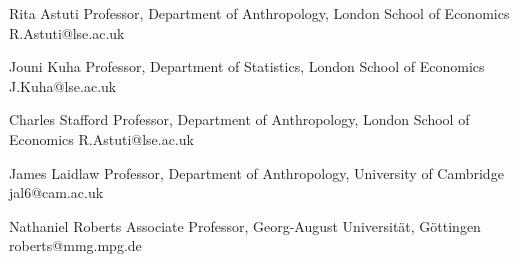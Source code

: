 

\begin{cvreferences}


  \cvreference
    {Rita Astuti} %
    {Professor, Department of Anthropology, London School of Economics} %
    {R.Astuti@lse.ac.uk}

  \cvreference
    {Jouni Kuha} %
    {Professor, Department of Statistics, London School of Economics} %
    {J.Kuha@lse.ac.uk}


  \cvreference
    {Charles Stafford} %
    {Professor, Department of Anthropology, London School of Economics} %
    {R.Astuti@lse.ac.uk}


\end{cvreferences}


\begin{cvreferences}

  \cvreference
    {James Laidlaw} %
    {Professor, Department of Anthropology, University of Cambridge} %
    {jal6@cam.ac.uk}

  \cvreference
    {Nathaniel Roberts} %
    {Associate Professor, Georg-August Universität, Göttingen} %
    {roberts@mmg.mpg.de}

\end{cvreferences}
